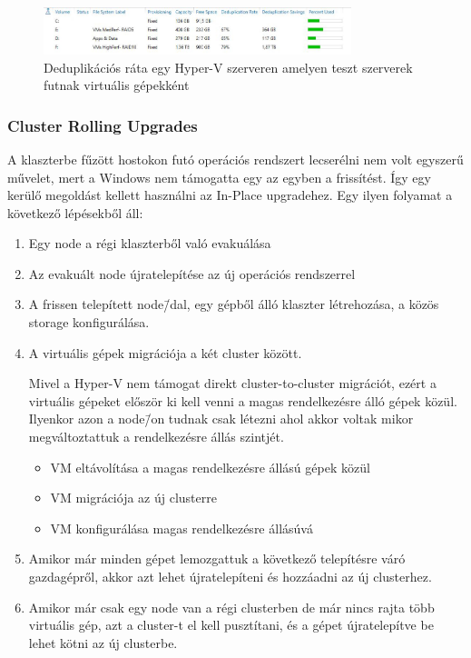\documentclass[12pt,oneside,justify]{book}
\begin{document}
\begin{figure}[h]
\centering
\includegraphics[width=0.8\textwidth]{deduplication-ratio-sample}
\caption{Deduplikációs ráta egy Hyper-V szerveren amelyen teszt szerverek futnak virtuális gépekként}
\label{fig:deduplication_ratio}
\end{figure}

\subsubsection{Cluster Rolling Upgrades}

A klaszterbe fűzött hostokon futó operációs rendszert lecserélni nem volt egyszerű művelet, mert a Windows nem támogatta egy az egyben a frissítést. Így egy kerülő megoldást kellett használni az In-Place upgradehez. Egy ilyen folyamat a következő lépésekből áll:
\begin{enumerate}
	\item Egy node a régi klaszterből való evakuálása
	\item Az evakuált node újratelepítése az új operációs rendszerrel
	\item A frissen telepített node\=/dal, egy gépből álló klaszter létrehozása, a közös storage konfigurálása.
 	\item A virtuális gépek migrációja a két cluster között.

Mivel a Hyper-V nem támogat direkt cluster-to-cluster migrációt, ezért a virtuális gépeket először ki kell venni a magas rendelkezésre álló gépek közül. Ilyenkor azon a node\=/on tudnak csak létezni ahol akkor voltak mikor megváltoztattuk a rendelkezésre állás szintjét.
	\begin{itemize}
		
		\item VM eltávolítása a magas rendelkezésre állású gépek közül
		\item VM migrációja az új clusterre
		\item VM konfigurálása magas rendelkezésre állásúvá
	\end{itemize}
	\item Amikor már minden gépet lemozgattuk a következő telepítésre váró gazdagépről, akkor azt lehet újratelepíteni és hozzáadni az új clusterhez.
	\item Amikor már csak egy node van a régi clusterben de már nincs rajta több virtuális gép, azt a cluster-t el kell pusztítani, és a gépet újratelepítve be lehet kötni az új clusterbe.
\end{enumerate}
\end{document}
